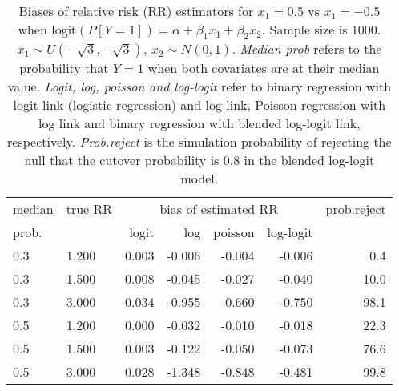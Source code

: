\documentclass[12pt,a4paper]{article}
\begin{document}
\begin{table}[H] 
\small\sf\centering 
\caption{Biases of relative risk (RR) estimators for $x_1=0.5$ vs $x_1=-0.5$ when $\mbox{logit}(P[Y=1])=\alpha+\beta_1 x_1 + \beta_2 x_2$. Sample size is 1000. $x_1 \sim $$U(-\sqrt{3},-\sqrt{3})$, $x_2 \sim N(0,1)$. {\it Median prob} refers to the probability that $Y=1$ when both covariates are at their median value. {\it Logit, log, poisson and log-logit} refer to binary regression with logit link (logistic regression) and log link, Poisson regression with log link and binary regression with blended log-logit link, respectively. {\it Prob.reject} is the simulation probability of rejecting the null that the cutover probability is $0.8$ in the blended log-logit model.} 
\begin{tabular}{llrrrrr} 
\toprule 
median & true RR & \multicolumn{4}{c}{bias of estimated RR} & prob.reject \\ 
prob. & & logit & log & poisson & log-logit  & \\ \midrule 
0.3 & 1.200 & 0.003 & -0.006 & -0.004 & -0.006 &  0.4 \\  
0.3 & 1.500 & 0.008 & -0.045 & -0.027 & -0.040 & 10.0 \\  
0.3 & 3.000 & 0.034 & -0.955 & -0.660 & -0.750 & 98.1 \\  
0.5 & 1.200 & 0.000 & -0.032 & -0.010 & -0.018 & 22.3 \\  
0.5 & 1.500 & 0.003 & -0.122 & -0.050 & -0.073 & 76.6 \\  
0.5 & 3.000 & 0.028 & -1.348 & -0.848 & -0.481 & 99.8 \\  
\bottomrule 
\end{tabular} 
\end{table} 
\end{document}
